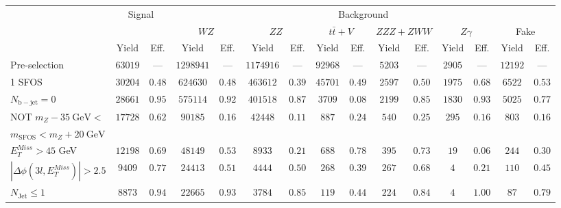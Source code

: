 \begin{tabular}{l||c|c||c|c||c|c||c|c||c|c||c|c||c|c}
\hline
 &\multicolumn{2}{c||}{Signal}            &  \multicolumn{12}{c}{Background}  \\
 & &  & \multicolumn{2}{c||}{$WZ$} & \multicolumn{2}{c||}{$ZZ$} & \multicolumn{2}{c||}{$t\bar{t}+V$} & \multicolumn{2}{c||}{$ZZZ+ZWW$} & \multicolumn{2}{c||}{$Z\gamma$} & \multicolumn{2}{c}{Fake} \\ 
 & Yield & Eff. & Yield & Eff. & Yield & Eff. & Yield & Eff. & Yield & Eff. & Yield & Eff. & Yield & Eff. \\
\hline\hline
Pre-selection &  $63019$ & --- &  $1298941$ & --- &  $1174916$ & --- &  $92968$ & --- &  $5203$ & --- &  $2905$ & --- &  $12192$ & --- \\
\hline
1 SFOS &  $30204$ &  $0.48$ &  $624630$ &  $0.48$ &  $463612$ &  $0.39$ &  $45701$ &  $0.49$ &  $2597$ &  $0.50$ &  $1975$ &  $0.68$ &  $6522$ &  $0.53$\\ 
\hline
$N_{\mathrm{b-jet}} = 0$ &  $28661$ &  $0.95$ &  $575114$ &  $0.92$ &  $401518$ &  $0.87$ &  $3709$ &  $0.08$ &  $2199$ &  $0.85$ &  $1830$ &  $0.93$ &  $5025$ &  $0.77$\\ 
\hline
NOT $m_Z - 35~\mathrm{GeV} <$  &  \multirow{2}{*}{$17728$} &  \multirow{2}{*}{$0.62$} &  \multirow{2}{*}{$90185$} &  \multirow{2}{*}{$0.16$} &  \multirow{2}{*}{$42448$} &  \multirow{2}{*}{$0.11$} &  \multirow{2}{*}{$887$} &  \multirow{2}{*}{$0.24$} &  \multirow{2}{*}{$540$} &  \multirow{2}{*}{$0.25$} &  \multirow{2}{*}{$295$} &  \multirow{2}{*}{$0.16$} &  \multirow{2}{*}{$803$} &  \multirow{2}{*}{$0.16$} \\ 
$ m_{\mathrm{SFOS}} < m_Z + 20~\mathrm{GeV}$  & & & & & & & & & & & & & & \\
\hline
$E_{T}^{Miss} > 45$ GeV &  $12198$ &  $0.69$ &  $48149$ &  $0.53$ &  $8933$ &  $0.21$ &  $688$ &  $0.78$ &  $395$ &  $0.73$ &  $19$ &  $0.06$ &  $244$ &  $0.30$\\ 
\hline
$|\Delta\phi(3l,E_{T}^{Miss})| > 2.5$ &  $9409$ &  $0.77$ &  $24413$ &  $0.51$ &  $4444$ &  $0.50$ &  $268$ &  $0.39$ &  $267$ &  $0.68$ &  $4$ &  $0.21$ &  $110$ &  $0.45$\\ 
\hline
$N_{\mathrm{Jet}} \leq 1$ &  $8873$ &  $0.94$ &  $22665$ &  $0.93$ &  $3784$ &  $0.85$ &  $119$ &  $0.44$ &  $224$ &  $0.84$ &  $4$ &  $1.00$ &  $87$ &  $0.79$\\ 
\hline
\end{tabular}
